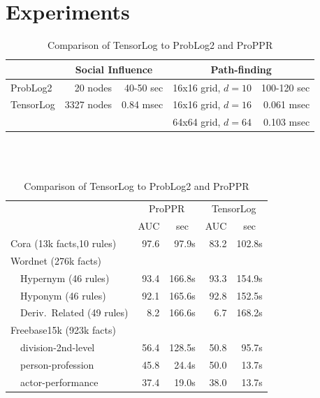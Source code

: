 \documentclass{article}
\begin{document}
\section{Experiments}

\begin{table}
\caption{\small Comparison of TensorLog to ProbLog2 and ProPPR} \label{tab:results}
\begin{center}
\begin{tabular}{l|rr|rr}
\hline
          & \multicolumn{2}{c|}{Social Influence} & \multicolumn{2}{c}{Path-finding} \\
\hline
ProbLog2  &   20 nodes & 40-50 sec & 16x16 grid, $d=10$ & 100-120 sec  \\
TensorLog & 3327 nodes & 0.84 msec & 16x16 grid, $d=16$ & 0.061 msec      \\
          &            &           & 64x64 grid, $d=64$ & 0.103 msec      \\
\hline
\end{tabular}

~\\
~\\

\begin{tabular}{l|rr|rr} \hline
                      & \multicolumn{2}{c|}{ProPPR} & \multicolumn{2}{c}{TensorLog} \\
                      & \multicolumn{1}{c}{AUC} & \multicolumn{1}{c|}{sec} &
                                                  \multicolumn{1}{c}{AUC} & \multicolumn{1}{c}{sec} \\
\hline
Cora (13k facts,10 rules)
                      & 97.6   & 97.9s      & 83.2   & 102.8s \\
\hline
Wordnet (276k facts)  &          &          &        &          \\
~~Hypernym (46 rules) & 93.4     & 166.8s   & 93.3   & 154.9s   \\
~~Hyponym (46 rules)  & 92.1     & 165.6s   & 92.8   & 152.5s   \\
~~Deriv.~Related (49 rules)  
                      &  8.2     & 166.6s    & 6.7    & 168.2s  \\
\hline
Freebase15k (923k facts)   &          &          &        &     \\
~~division-2nd-level  &  56.4    & 128.5s   &  50.8  & 95.7s    \\
~~person-profession   &  45.8    & 24.4s    &  50.0  & 13.7s    \\
~~actor-performance   &  37.4    & 19.0s    &  38.0  & 13.7s    \\
\hline
\end{tabular}
\end{center}
\end{table}
\end{document}
